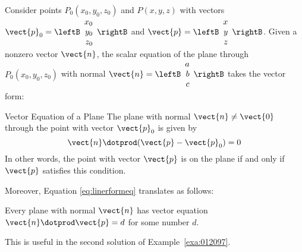\noindent Consider points $P_{0}(x_{0}, y_{0}, z_{0})$ and $P(x, y, z)$ with vectors $\vect{p}_{0} = \leftB
\begin{array}{r}
x_{0}\\
y_{0}\\
z_{0}
\end{array}
\rightB$
and 
$\vect{p}= \leftB
\begin{array}{r}
x\\
y\\
z
\end{array}
\rightB$.
Given a nonzero vector $\vect{n}$, the scalar equation of the plane through $P_{0}(x_{0}, y_{0}, z_{0})$ with normal $\vect{n} = \leftB
\begin{array}{r}
a\\
b\\
c
\end{array}
\rightB$ takes the vector form:


\begin{theorem*}[label=thm:012088]{Vector Equation of a Plane}
The plane with normal $\vect{n} \neq \vect{0}$ through the point with vector $\vect{p}_{0}$ is given by
\begin{equation*}
\vect{n} \dotprod (\vect{p} - \vect{p}_{0}) = 0
\end{equation*}
In other words, the point with vector $\vect{p}$ is on the plane if and only if $\vect{p}$ satisfies this condition.
\end{theorem*}

\noindent Moreover, Equation \ref{eq:linerformeq} translates as follows:
\begin{center}
Every plane with normal $\vect{n}$ has vector equation $\vect{n} \dotprod \vect{p} = d$ for some number $d$.
\end{center}
\noindent This is useful in the second solution of Example~\ref{exa:012097}.



